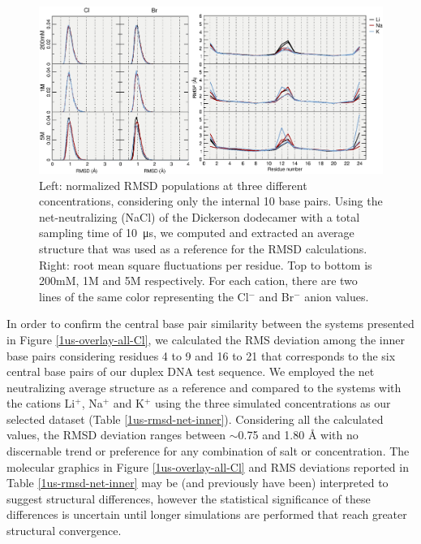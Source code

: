 \documentclass[9pt,lessons]{livecoms}
\begin{document}
\begin{figure}[h!]
\centering
\includegraphics[width=\linewidth]{10us-rms-ALL-inner-avg}
\caption{Left: normalized RMSD populations at three different concentrations, considering only the internal 10 base pairs. Using the net-neutralizing (NaCl) of the Dickerson dodecamer with a total sampling time of \SI{10}{\micro\second}, we computed and extracted an average structure that was used as a reference for the RMSD calculations. Right: root mean square fluctuations per residue. Top to bottom is 200mM, 1M and 5M respectively. For each cation, there are two lines of the same color representing the Cl$^{-}$ and Br$^{-}$ anion values.}
\label{10us-rms-ALL-inner-avg}
\end{figure}

In order to confirm the central base pair similarity between the
systems presented in Figure \ref{1us-overlay-all-Cl}, we calculated
the RMS deviation among the inner base pairs considering residues 4 to
9 and 16 to 21 that corresponds to the six central base pairs of our
duplex DNA test sequence. We employed the net neutralizing average
structure as a reference and compared to the systems with the cations
Li$^{+}$, Na$^{+}$ and K$^{+}$ using the three simulated
concentrations as our selected dataset (Table
\ref{1us-rmsd-net-inner}). Considering all the calculated values, the
RMSD deviation ranges between $\sim$0.75 and 1.80 Å with no discernable
trend or preference for any combination of salt or concentration. The
molecular graphics in Figure \ref{1us-overlay-all-Cl} and RMS
deviations reported in Table \ref{1us-rmsd-net-inner} may be (and
previously have been) interpreted to suggest structural differences,
however the statistical significance of these differences is uncertain until longer simulations are performed that reach greater structural convergence.
\end{document}
